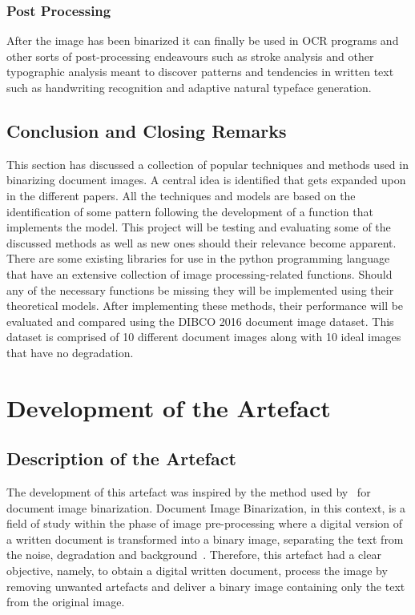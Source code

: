 \documentclass[a4paper, 12pt]{report}
\begin{document}
\subsection{Post Processing}
After the image has been binarized it can finally be used in OCR programs and
other sorts of post-processing endeavours such as stroke analysis and other
typographic analysis meant to discover patterns and tendencies in written text
such as handwriting recognition and adaptive natural typeface generation.

\section{Conclusion and Closing Remarks}
This section has discussed a collection of popular techniques and methods used
in binarizing document images. A central idea is identified that gets expanded
upon in the different papers. All the techniques and models are based on the
identification of some pattern following the development of a function that
implements the model. This project will be testing and evaluating some of the
discussed methods as well as new ones should their relevance become apparent.
There are some existing libraries for use in the python programming language
that have an extensive collection of image processing-related functions. Should
any of the necessary functions be missing they will be implemented using their
theoretical models. After implementing these methods, their performance will be
evaluated and compared using the DIBCO 2016 document image dataset. This
dataset is comprised of 10 different document images along with 10 ideal images
that have no degradation.

\chapter{Development of the Artefact}

\section{Description of the Artefact}
The development of this artefact was inspired by the method used
by~\cite{su2012robust} for document image binarization. Document Image
Binarization, in this context, is a field of study within the phase of image
pre-processing where a digital version of a written document is transformed
into a binary image, separating the text from the noise, degradation and
background~\cite{su2012robust}. Therefore, this artefact had a clear objective,
namely, to obtain a digital written document, process the image by removing
unwanted artefacts and deliver a binary image containing only the text from the
original image.\par
\end{document}
